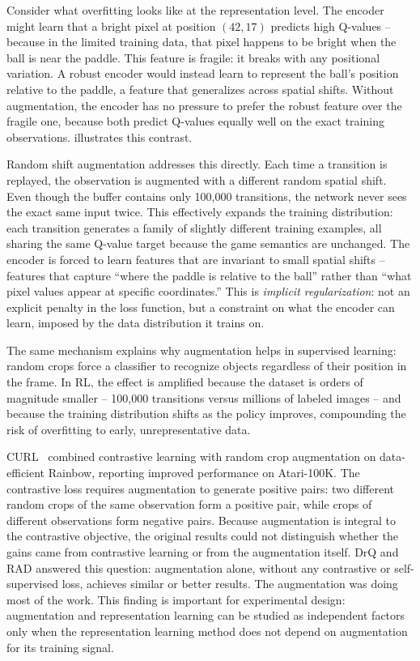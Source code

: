 \smallskip
Consider what overfitting looks like at the representation level.
The encoder might learn that a bright pixel at position $(42, 17)$
predicts high Q-values -- because in the limited training data,
that pixel happens to be bright when the ball is near the paddle.
This feature is fragile: it breaks with any positional variation.
A robust encoder would instead learn to represent the ball's
position relative to the paddle, a feature that generalizes across
spatial shifts. Without augmentation, the encoder has no pressure
to prefer the robust feature over the fragile one, because both
predict Q-values equally well on the exact training observations.
 illustrates this contrast.



\smallskip
Random shift augmentation addresses this directly. Each time a
transition is replayed, the observation is augmented with a
different random spatial shift. Even though the buffer contains
only 100{,}000 transitions, the network never sees the exact same
input twice. This effectively expands the training distribution:
each transition generates a family of slightly different training
examples, all sharing the same Q-value target because the game
semantics are unchanged. The encoder is forced to learn features
that are invariant to small spatial shifts -- features that capture
``where the paddle is relative to the ball'' rather than ``what
pixel values appear at specific coordinates.'' This is
\emph{implicit regularization}: not an explicit penalty in the loss
function, but a constraint on what the encoder can learn, imposed
by the data distribution it trains on.

\smallskip
The same mechanism explains why augmentation helps in supervised
learning: random crops force a classifier to recognize objects
regardless of their position in the frame. In RL, the effect is
amplified because the dataset is orders of magnitude smaller --
100{,}000 transitions versus millions of labeled images -- and
because the training distribution shifts as the policy improves,
compounding the risk of overfitting to early, unrepresentative
data.

\smallskip
CURL~\citep{laskin2020curl} combined contrastive learning with
random crop augmentation on data-efficient Rainbow, reporting
improved performance on Atari-100K. The contrastive loss requires
augmentation to generate positive pairs: two different random crops
of the same observation form a positive pair, while crops of
different observations form negative pairs. Because augmentation is
integral to the contrastive objective, the original results could
not distinguish whether the gains came from contrastive learning or
from the augmentation itself. DrQ and RAD answered this question:
augmentation alone, without any contrastive or self-supervised
loss, achieves similar or better results. The augmentation was
doing most of the work. This finding is important for experimental
design: augmentation and representation learning can be studied as
independent factors only when the representation learning method
does not depend on augmentation for its training signal.

